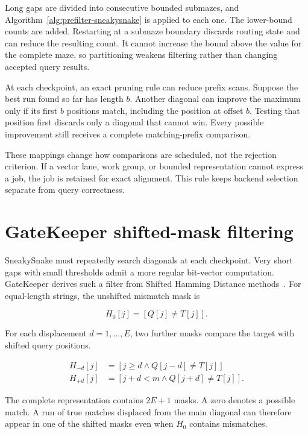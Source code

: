 Long gaps are divided into consecutive bounded submazes, and
Algorithm~\ref{alg:prefilter-sneakysnake} is applied to each one. The
lower-bound counts are added. Restarting at a submaze boundary discards routing
state and can reduce the resulting count. It cannot increase the bound above
the value for the complete maze, so partitioning weakens filtering rather than
changing accepted query results.

At each checkpoint, an exact pruning rule can reduce prefix scans. Suppose the
best run found so far has length \(b\). Another diagonal can improve the
maximum only if its first \(b\) positions match, including the position at
offset \(b\). Testing that position first discards only a diagonal that cannot
win. Every possible improvement still receives a complete matching-prefix
comparison.

These mappings change how comparisons are scheduled, not the rejection
criterion. If a vector lane, work group, or bounded representation cannot
express a job, the job is retained for exact alignment. This rule keeps
backend selection separate from query correctness.

\section{GateKeeper shifted-mask filtering}
\label{sec:prefilter-gatekeeper}

SneakySnake must repeatedly search diagonals at each checkpoint. Very short
gaps with small thresholds admit a more regular bit-vector computation.
GateKeeper derives such a filter from Shifted Hamming Distance
methods~\cite{gatekeeper_paper,gatekeeper_gpu_paper}. For equal-length strings,
the unshifted mismatch mask is

\[
    H_0[j]=[Q[j]\neq T[j]].
\]

For each displacement \(d=1,\ldots,E\), two further masks compare the target
with shifted query positions.

\[
\begin{aligned}
H_{-d}[j] &= [j\geq d \land Q[j-d]\neq T[j]]\\
H_{+d}[j] &= [j+d<m \land Q[j+d]\neq T[j]].
\end{aligned}
\]

The complete representation contains \(2E+1\) masks. A zero denotes a possible
match. A run of true matches displaced from the main diagonal can therefore
appear in one of the shifted masks even when \(H_0\) contains mismatches.

